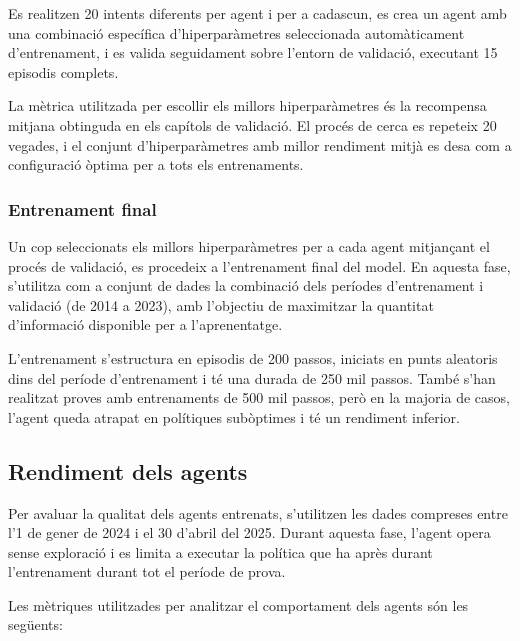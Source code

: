\documentclass[12pt,a4paper,twoside]{book}
\begin{document}
Es realitzen 20 intents diferents per agent i per a cadascun, es crea un agent amb una combinació específica d'hiperparàmetres seleccionada automàticament d'entrenament, i es valida seguidament sobre l'entorn de validació, executant 15 episodis complets.

La mètrica utilitzada per escollir els millors hiperparàmetres és la recompensa mitjana obtinguda en els capítols de validació. El procés de cerca es repeteix 20 vegades, i el conjunt d'hiperparàmetres amb millor rendiment mitjà es desa com a configuració òptima per a tots els entrenaments.

\subsubsection{Entrenament final}

Un cop seleccionats els millors hiperparàmetres per a cada agent mitjançant el procés de validació, es procedeix a l'entrenament final del model. En aquesta fase, s'utilitza com a conjunt de dades la combinació dels períodes d'entrenament i validació (de 2014 a 2023), amb l'objectiu de maximitzar la quantitat d'informació disponible per a l'aprenentatge.

L'entrenament s'estructura en episodis de 200 passos, iniciats en punts aleatoris dins del període d'entrenament i té una durada de 250 mil passos. També s'han realitzat proves amb entrenaments de 500 mil passos, però en la majoria de casos, l'agent queda atrapat en polítiques subòptimes i té un rendiment inferior.


\subsection{Rendiment dels agents}
Per avaluar la qualitat dels agents entrenats, s'utilitzen les dades compreses entre l'1 de gener de 2024 i el 30 d'abril del 2025. Durant aquesta fase, l'agent opera sense exploració i es limita a executar la política que ha après durant l'entrenament durant tot el període de prova.

Les mètriques utilitzades per analitzar el comportament dels agents són les següents:
\end{document}
